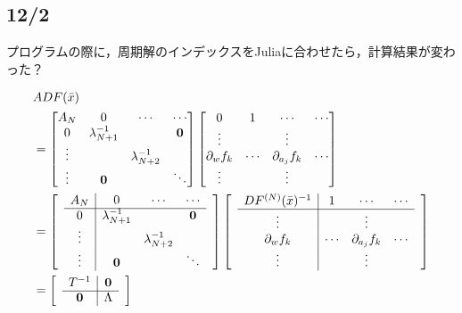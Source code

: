 \documentclass[11pt,a4paper,titlepage]{jsreport}
\theoremstyle{definition}
\begin{document}
\subsection*{12/2}
プログラムの際に，周期解のインデックスをJuliaに合わせたら，計算結果が変わった？

\begin{equation}
  \begin{split}
    &ADF(\bar{x}) \\
    &= \begin{bmatrix}
      A_N & 0  & \cdots & \cdots  \\
      0 & \lambda_{N+1}^{-1} & & \mathbf{0} \\
      \vdots & & \lambda_{N+2}^{-1} & \\
      \vdots & \mathbf{0} & & \ddots
    \end{bmatrix}
    \begin{bmatrix}
      0 & 1  & \cdots & \cdots \\
      \vdots & & \vdots &\\
      \partial_w f_k & \cdots & \partial_{a_j}f_k & \cdots \\
      \vdots & & \vdots &
   \end{bmatrix}\\
    &= \begin{bmatrix}
      & \multicolumn{1}{c|}{A_N} & 0 & \cdots & \cdots  & \\ \cline{2-5}
      & \multicolumn{1}{c|}{0} & \lambda_{N+1}^{-1} & & \mathbf{0} & \\
      & \multicolumn{1}{c|}{\vdots} & & \lambda_{N+2}^{-1} & & \\
      & \multicolumn{1}{c|}{\vdots} & \mathbf{0} & & \ddots &
    \end{bmatrix}
    \begin{bmatrix}
      & \multicolumn{1}{c|}{DF^{(N)}(\bar{x})^{-1}} & 1  & \cdots & \cdots &\\ \cline{2-5}
      & \multicolumn{1}{c|}{\vdots} & & \vdots & &\\
      & \multicolumn{1}{c|}{\partial_w f_k} & \cdots & \partial_{a_j}f_k & \cdots &\\
      & \multicolumn{1}{c|}{\vdots} & & \vdots & &
    \end{bmatrix}\\
    &= \begin{bmatrix}
      & \multicolumn{1}{c|}{T^{-1}} & \mathbf{0} &  \\ \cline{2-3}
      & \multicolumn{1}{c|}{\mathbf{0}} & \Lambda &

\end{bmatrix}
\end{split}
\end{equation}
\end{document}

